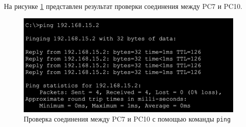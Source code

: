 \documentclass[12pt]{report}
\begin{document}
На рисунке \ref{fig:10} представлен результат проверки соединения между PC7 и PC10.

\begin{figure}[H]
	\begin{center}
		\includegraphics[scale=0.8]{img/10.png}
	\end{center}
	\caption{Проверка соединения между PC7 и PC10 с помощью команды \texttt{ping}}
	\label{fig:10}
\end{figure}



	
\end{document}
